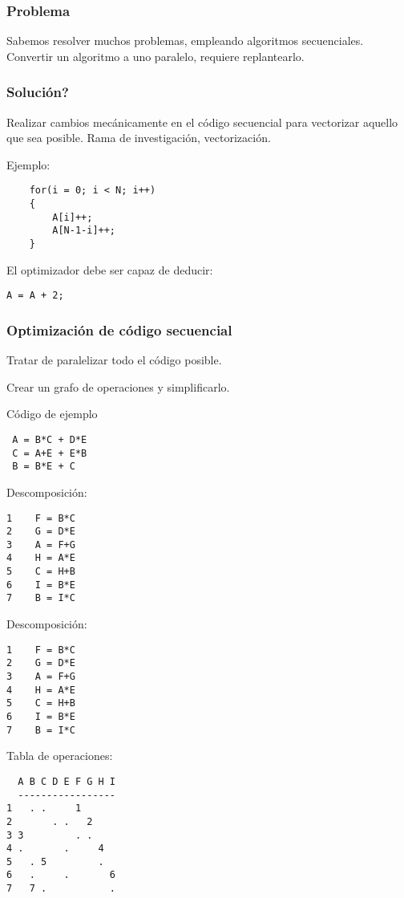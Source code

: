 \documentclass{beamer}
\begin{document}
\begin{frame}
\frametitle{Problema}

Sabemos resolver muchos problemas, empleando algoritmos secuenciales.
Convertir un algoritmo a uno paralelo, requiere replantearlo.

\end{frame}



\begin{frame}[fragile]
\frametitle{Solución?}

Realizar cambios mecánicamente en el código secuencial para vectorizar aquello
que sea posible. Rama de investigación, vectorización.

Ejemplo:

\begin{lstlisting}
    for(i = 0; i < N; i++)
    {
        A[i]++;
        A[N-1-i]++;
    }
\end{lstlisting}

El optimizador debe ser capaz de deducir:

\begin{lstlisting}
A = A + 2;
\end{lstlisting}

\end{frame}



\begin{frame}
\frametitle{Optimización de código secuencial}
Tratar de paralelizar todo el código posible.

Crear un grafo de operaciones y simplificarlo.
\end{frame}



\begin{frame}[fragile]
Código de ejemplo

\begin{lstlisting}
 A = B*C + D*E
 C = A+E + E*B
 B = B*E + C
\end{lstlisting}

Descomposición:

\begin{lstlisting}
1    F = B*C
2    G = D*E
3    A = F+G
4    H = A*E
5    C = H+B
6    I = B*E
7    B = I*C
\end{lstlisting}

\end{frame}



\begin{frame}[fragile]
Descomposición:
\begin{lstlisting}
1    F = B*C
2    G = D*E
3    A = F+G
4    H = A*E
5    C = H+B
6    I = B*E
7    B = I*C
\end{lstlisting}
Tabla de operaciones:
\begin{lstlisting}
  A B C D E F G H I
  -----------------
1   . .     1      
2       . .   2        
3 3         . .        
4 .       .     4     
5   . 5         .
6   .     .       6
7   7 .           .
\end{lstlisting}
\end{frame}
\end{document}
